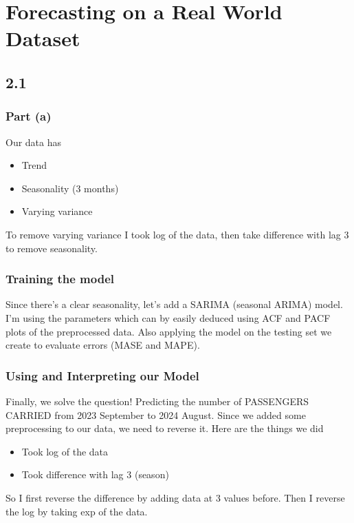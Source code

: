 \section{Forecasting on a Real World Dataset}
\subsection{2.1}
\subsubsection{Part (a)}
Our data has
\begin{itemize}
	\item Trend
	\item Seasonality (3 months)
	\item Varying variance
\end{itemize}

To remove varying variance I took log of the data, then take difference with lag 3 to remove seasonality.
\subsubsection{Training the model}
Since there's a clear seasonality, let's add a SARIMA (seasonal ARIMA) model.
I'm using the parameters which can by easily deduced using ACF and PACF plots
of the preprocessed data. Also applying the model on the testing set we create
to evaluate errors (MASE and MAPE).
\subsubsection{Using and Interpreting our Model}
Finally, we solve the question! Predicting the number of PASSENGERS CARRIED
from 2023 September to 2024 August. Since we added some preprocessing to our
data, we need to reverse it. Here are the things we did
\begin{itemize}
	\item Took log of the data
	\item Took difference with lag 3 (season)
\end{itemize}

So I first reverse the difference by adding data at 3 values before. Then I
reverse the log by taking exp of the data.

